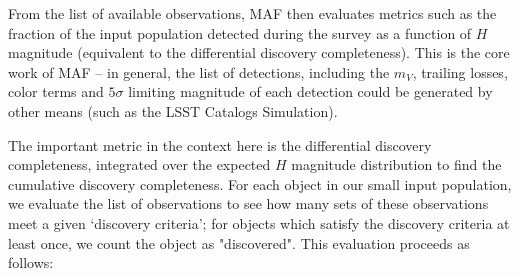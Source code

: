 From the list of available observations, MAF then evaluates metrics such as the fraction of the input population detected during the survey as a function of $H$ magnitude (equivalent to the differential discovery completeness). This is the core work of MAF -- in general, the list of detections, including 
the $m_V$, trailing losses, color terms and $5\sigma$ limiting magnitude of each detection could be generated by other means (such as the LSST Catalogs Simulation). 

The important metric in the context here is the differential discovery completeness, integrated over the expected $H$ magnitude distribution to find the cumulative discovery completeness. For each object in our small input population, we evaluate the list of observations to see how many sets of these observations meet a given `discovery criteria';  for objects which satisfy the discovery criteria at least once, we count the object as "discovered". This evaluation proceeds as follows:

